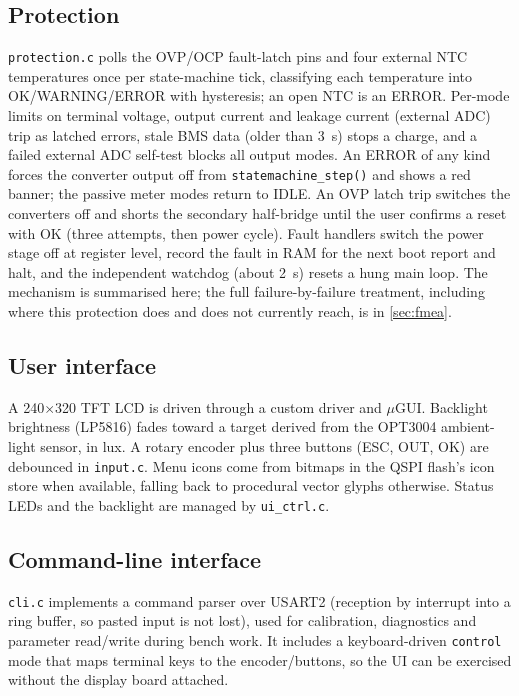 \subsection{Protection}

\texttt{protection.c} polls the \ac{OVP}/\ac{OCP} fault-latch pins and four
external \ac{NTC} temperatures once per state-machine tick, classifying
each temperature into OK/WARNING/ERROR with hysteresis; an open \ac{NTC}
is an ERROR. Per-mode limits on terminal voltage, output current and
leakage current (external \ac{ADC}) trip as latched errors, stale \ac{BMS}
data (older than \qty{3}{\second}) stops a charge, and a failed external
\ac{ADC} self-test blocks all output modes. An ERROR of any kind forces the
converter output off from \texttt{statemachine\_step()} and shows a red
banner; the passive meter modes return to IDLE. An \ac{OVP} latch trip
switches the converters off and shorts the secondary half-bridge until the
user confirms a reset with OK (three attempts, then power cycle). Fault handlers switch the power stage off at register
level, record the fault in RAM for the next boot report and halt, and the independent watchdog (about
\qty{2}{\second}) resets a hung main loop. The mechanism is summarised here; the full
failure-by-failure treatment, including where this protection does and
does not currently reach, is in \autoref{sec:fmea}.

\subsection{User interface}

A 240$\times$320 \ac{TFT} \ac{LCD} is driven through a custom driver and
$\mu$\ac{GUI}. Backlight brightness (LP5816) fades toward a target derived
from the OPT3004 ambient-light sensor, in lux. A rotary encoder plus
three buttons (ESC, OUT, OK) are debounced in \texttt{input.c}. Menu icons
come from bitmaps in the QSPI flash's icon store when available, falling
back to procedural vector glyphs otherwise. Status \acp{LED} and the
backlight are managed by \texttt{ui\_ctrl.c}.

\subsection{Command-line interface}

\texttt{cli.c} implements a command parser over USART2 (reception by
interrupt into a ring buffer, so pasted input is not lost), used for
calibration, diagnostics and parameter read/write during bench work. It
includes a keyboard-driven \texttt{control} mode that maps terminal keys to
the encoder/buttons, so the \ac{UI} can be exercised without the display
board attached.


